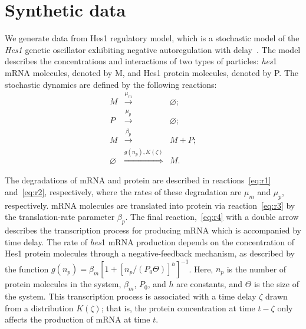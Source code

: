 \documentclass[twocolumn,pre,amsmath,amssymb]{revtex4-1}
\begin{document}
\section{Synthetic data\label{sec:appx:synthetic}}
	We generate data from Hes1 regulatory model, which is a stochastic model of the \emph{Hes1} genetic oscillator exhibiting negative autoregulation with delay~\cite{monk:hesmodel:2003,galla:fluctuation:2009}. The model describes the concentrations and interactions of two types of particles: \textit{hes}1 mRNA molecules, denoted by M, and Hes1 protein molecules, denoted by P. The stochastic dynamics are defined by the following reactions: 
	\begin{eqnarray}
	M&\stackrel{\mu_m}{\longrightarrow}&\varnothing; \label{eq:r1}\\
	P&\stackrel{\mu_p}{\longrightarrow}&\varnothing; \label{eq:r2}\\
	M&\stackrel{\beta_p}{\longrightarrow}&M+P; \label{eq:r3} \\
	\varnothing&\stackrel{g(n_p), K(\zeta)}{\Longrightarrow}&M.\label{eq:r4}
	\end{eqnarray}	
	
	The degradations of mRNA and protein are described in reactions~\eqref{eq:r1} and~\eqref{eq:r2}, respectively, where the rates of these degradation are $\mu_m $ and $\mu_p$, respectively. mRNA molecules are translated into protein via reaction~\eqref{eq:r3} by the translation-rate parameter $\beta_p$. The final reaction,~\eqref{eq:r4} with a double arrow describes the transcription process for producing mRNA which is accompanied by time delay. The rate of \textit{hes}1 mRNA production depends on the concentration of Hes1 protein molecules through a negative-feedback mechanism, as described by the function $g(n_p) = \beta_m \left[1+\left[n_p / (P_0\Theta) \right]^h\right]^{-1}$.
	Here, $n_p$ is the number of protein molecules in the system, $\beta_m$, $P_0$, and $h$ are constants, and $\Theta$ is the size of the system.
	This transcription process is associated with a time delay $\zeta$ drawn from a distribution $K(\zeta)$; that is, the protein concentration at time $t-\zeta$ only affects the production of mRNA at time $t$. 
	
\end{document}
